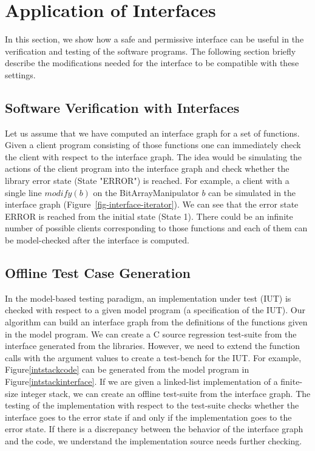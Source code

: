 \documentclass{llncs}
\begin{document}
\section{Application of Interfaces}

In this section, we show how a safe and permissive interface can be useful in the verification and testing of the software programs.
The following section briefly describe the modifications needed for the interface to be compatible with these settings. 

\subsection{Software Verification with Interfaces}

Let us assume that we have computed an interface graph for a set of functions.
Given a client program consisting of those functions one can immediately check the client with respect to the interface graph.
The idea would be simulating the actions of the client program into the interface graph and check whether the library error state (State "ERROR") is reached.
For example, a client with a single line $modify(b)$ on the BitArrayManipulator $b$ can be simulated in the interface graph 
(Figure~\ref{fig-interface-iterator}).
We can see that the error state ERROR is reached from the initial state (State 1).
There could be an infinite number of possible clients corresponding to those functions and each of them
can be model-checked after the interface is computed.  

\subsection{Offline Test Case Generation}
In the model-based testing paradigm, an implementation under test (IUT) is checked with respect to a given model program 
(a specification of the IUT).
Our algorithm can build an interface graph from the definitions of the functions given in the model program.
We can create a C source regression test-suite from the interface generated from the libraries. 
However, we need to extend the function calls with the argument values to create a test-bench for the IUT.
For example, Figure\ref{intstackcode} can be generated from the model program in Figure\ref{intstackinterface}. 
If we are given a linked-list  implementation of a finite-size integer stack,  we can create an offline test-suite 
from the interface graph.
The testing of the implementation with respect to the test-suite checks whether the interface goes to the error state if and only
if the implementation goes to the error state.
If there is a discrepancy between the behavior of the interface graph and the code, we understand the implementation source
needs further checking. 
\end{document}
